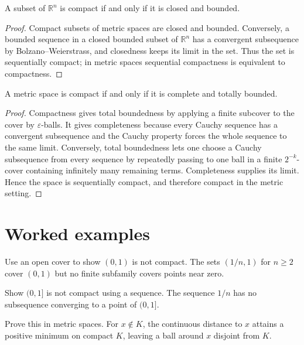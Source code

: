 \begin{theorem}\label{thm:ii06-04}
A subset of $\mathbb R^n$ is compact if and only if it is closed and bounded.
\begin{proof}
Compact subsets of metric spaces are closed and bounded. Conversely, a bounded sequence in a closed bounded subset of $\mathbb R^n$ has a convergent subsequence by Bolzano--Weierstrass, and closedness keeps its limit in the set. Thus the set is sequentially compact; in metric spaces sequential compactness is equivalent to compactness.
\end{proof}
\end{theorem}

\begin{theorem}\label{thm:ii06-05}
A metric space is compact if and only if it is complete and totally bounded.
\begin{proof}
Compactness gives total boundedness by applying a finite subcover to the cover by $\varepsilon$-balls. It gives completeness because every Cauchy sequence has a convergent subsequence and the Cauchy property forces the whole sequence to the same limit. Conversely, total boundedness lets one choose a Cauchy subsequence from every sequence by repeatedly passing to one ball in a finite $2^{-k}$-cover containing infinitely many remaining terms. Completeness supplies its limit. Hence the space is sequentially compact, and therefore compact in the metric setting.
\end{proof}
\end{theorem}

\section{Worked examples}

\begin{example}\label{ex:ii06-worked-01}
Use an open cover to show $(0,1)$ is not compact. The sets $(1/n,1)$ for $n\ge2$ cover $(0,1)$ but no finite subfamily covers points near zero.
\end{example}

\begin{example}\label{ex:ii06-worked-02}
Show $(0,1]$ is not compact using a sequence. The sequence $1/n$ has no subsequence converging to a point of $(0,1]$.
\end{example}

\begin{example}\label{ex:ii06-worked-03}
Prove this in metric spaces. For $x\notin K$, the continuous distance to $x$ attains a positive minimum on compact $K$, leaving a ball around $x$ disjoint from $K$.
\end{example}

